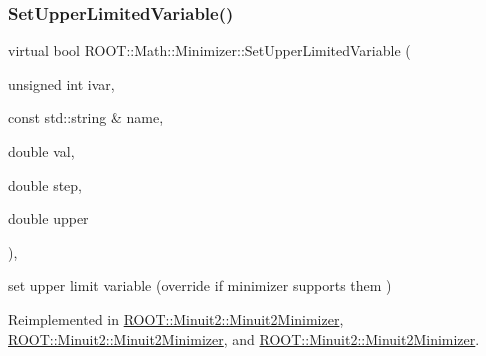 \subsubsection{\texorpdfstring{SetUpperLimitedVariable()}{SetUpperLimitedVariable()}\hspace{0.1cm}{\footnotesize\ttfamily [3/3]}}
{\footnotesize\ttfamily virtual bool R\+O\+O\+T\+::\+Math\+::\+Minimizer\+::\+Set\+Upper\+Limited\+Variable (\begin{DoxyParamCaption}\item[{unsigned int}]{ivar,  }\item[{const std\+::string \&}]{name,  }\item[{double}]{val,  }\item[{double}]{step,  }\item[{double}]{upper }\end{DoxyParamCaption})\hspace{0.3cm}{\ttfamily [inline]}, {\ttfamily [virtual]}}



set upper limit variable (override if minimizer supports them ) 



Reimplemented in \mbox{\hyperlink{classROOT_1_1Minuit2_1_1Minuit2Minimizer_a70209b37c419af5d8d1475ce8de29b43}{R\+O\+O\+T\+::\+Minuit2\+::\+Minuit2\+Minimizer}}, \mbox{\hyperlink{classROOT_1_1Minuit2_1_1Minuit2Minimizer_a70209b37c419af5d8d1475ce8de29b43}{R\+O\+O\+T\+::\+Minuit2\+::\+Minuit2\+Minimizer}}, and \mbox{\hyperlink{classROOT_1_1Minuit2_1_1Minuit2Minimizer_a70209b37c419af5d8d1475ce8de29b43}{R\+O\+O\+T\+::\+Minuit2\+::\+Minuit2\+Minimizer}}.

